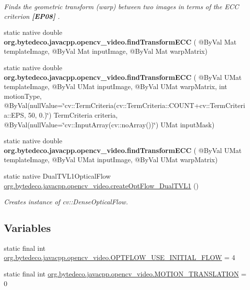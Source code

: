 \begin{DoxyCompactItemize}
\begin{DoxyCompactList}\small\item\em Finds the geometric transform (warp) between two images in terms of the E\+CC criterion {\bfseries [E\+P08]} . \end{DoxyCompactList}\item 
\mbox{\label{group__video__track_gae909b79952b7cc6c3ab1d41e25818194}} 
static native double {\bfseries org.\+bytedeco.\+javacpp.\+opencv\+\_\+video.\+find\+Transform\+E\+CC} ( @By\+Val Mat template\+Image, @By\+Val Mat input\+Image, @By\+Val Mat warp\+Matrix)
\item 
\mbox{\label{group__video__track_ga88ed488cd7541be16028a844f27feec0}} 
static native double {\bfseries org.\+bytedeco.\+javacpp.\+opencv\+\_\+video.\+find\+Transform\+E\+CC} ( @By\+Val U\+Mat template\+Image, @By\+Val U\+Mat input\+Image, @By\+Val U\+Mat warp\+Matrix, int motion\+Type, @By\+Val(null\+Value=\char`\"{}cv\+::\+Term\+Criteria(cv\+::\+Term\+Criteria\+::\+C\+O\+U\+NT+cv\+::\+Term\+Criteria\+::\+E\+PS, 50, 0.)\char`\"{}) Term\+Criteria criteria, @By\+Val(null\+Value=\char`\"{}cv\+::\+Input\+Array(cv\+::no\+Array())\char`\"{}) U\+Mat input\+Mask)
\item 
\mbox{\label{group__video__track_gabd03c566ba6b0cdc850ca5b9bd03a2c6}} 
static native double {\bfseries org.\+bytedeco.\+javacpp.\+opencv\+\_\+video.\+find\+Transform\+E\+CC} ( @By\+Val U\+Mat template\+Image, @By\+Val U\+Mat input\+Image, @By\+Val U\+Mat warp\+Matrix)
\item 
\mbox{\label{group__video__track_ga02df311817502c4c088084195093be2e}} 
static native Dual\+T\+V\+L1\+Optical\+Flow \hyperlink{group__video__track_ga02df311817502c4c088084195093be2e}{org.\+bytedeco.\+javacpp.\+opencv\+\_\+video.\+create\+Opt\+Flow\+\_\+\+Dual\+T\+V\+L1} ()
\begin{DoxyCompactList}\small\item\em Creates instance of cv\+::\+Dense\+Optical\+Flow. \end{DoxyCompactList}\end{DoxyCompactItemize}
\subsection*{Variables}
\begin{DoxyCompactItemize}
\item 
static final int \hyperlink{group__video__track_ga7544170e893b4e8835522881418d396d}{org.\+bytedeco.\+javacpp.\+opencv\+\_\+video.\+O\+P\+T\+F\+L\+O\+W\+\_\+\+U\+S\+E\+\_\+\+I\+N\+I\+T\+I\+A\+L\+\_\+\+F\+L\+OW} = 4
\item 
static final int \hyperlink{group__video__track_gaf37f7c8ec20fc62ff4ba2f00de67f1b3}{org.\+bytedeco.\+javacpp.\+opencv\+\_\+video.\+M\+O\+T\+I\+O\+N\+\_\+\+T\+R\+A\+N\+S\+L\+A\+T\+I\+ON} = 0
\end{DoxyCompactItemize}


